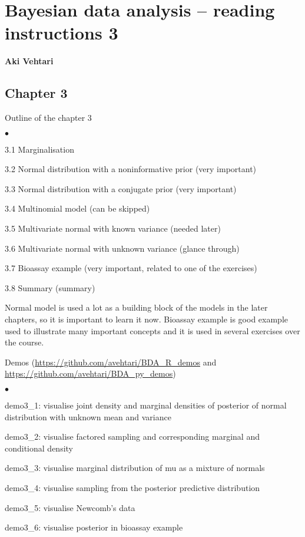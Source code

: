 \documentclass[a4paper,11pt,english]{article}
\begin{document}
\thispagestyle{empty}

\section*{Bayesian data analysis -- reading instructions 3} 
\smallskip
{\bf Aki Vehtari}
\smallskip

\subsection*{Chapter 3}

Outline of the chapter 3
\begin{list}{$\bullet$}{\parsep=0pt\itemsep=2pt}
\item 3.1 Marginalisation
\item 3.2 Normal distribution with a noninformative prior (very important)
\item 3.3 Normal distribution with a conjugate prior (very important)
\item 3.4 Multinomial model (can be skipped)
\item 3.5 Multivariate normal with known variance (needed later)
\item 3.6 Multivariate normal with unknown variance (glance through)
\item 3.7 Bioassay example (very important, related to one of the exercises)
\item 3.8 Summary (summary)
\end{list}

Normal model is used a lot as a building block of the models in the
later chapters, so it is important to learn it now.
Bioassay example is good example used to illustrate many important
concepts and it is used in several exercises over the course.

Demos (\url{https://github.com/avehtari/BDA_R_demos} and \url{https://github.com/avehtari/BDA_py_demos})
\begin{list}{$\bullet$}{\parsep=0pt\itemsep=2pt}
\item demo3\_1: visualise joint density and marginal densities of
  posterior of normal distribution with unknown mean and variance
\item demo3\_2: visualise factored sampling and corresponding
  marginal and conditional density
\item demo3\_3: visualise marginal distribution of mu as a mixture of normals
\item demo3\_4: visualise sampling from the posterior predictive distribution
\item demo3\_5: visualise Newcomb's data
\item demo3\_6: visualise posterior in bioassay example
\end{list}
\end{document}
